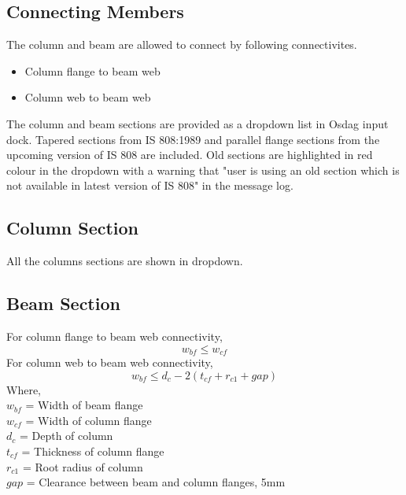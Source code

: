 \documentclass[11.5pt,a4paper,oneside]{report}
\begin{document}
\begin{Form}
\chapter{Connecting Members}
%
The column and beam are allowed to connect by following connectivites.
\begin{itemize}
	\item Column flange to beam web
	\item Column web to beam web
\end{itemize}
%
The column and beam sections are provided as a dropdown list in Osdag input dock. Tapered sections from IS 808:1989 and parallel flange sections from the upcoming version of IS 808 are included. Old sections are highlighted in red colour in the dropdown with a warning that "user is using an old section which is not available in latest version of IS 808" in the message log.
%
\section{Column Section}
%
All the columns sections are shown in dropdown.
\section{Beam Section}
%
For column flange to beam web connectivity, 
\begin{equation}
	w_{bf} \le w_{cf}
\end{equation}
%
For column web to beam web connectivity,
\begin{equation}
	w_{bf} \le d_c - 2 (t_{cf} + r_{c1} + gap)
\end{equation}
Where, \\
\indent $w_{bf}$ = Width of beam flange \\
\indent $w_{cf}$ =  Width of column flange \\
\indent $d_c$ = Depth of column \\
\indent $t_{cf}$ = Thickness of column flange \\
\indent $r_{c1}$ = Root radius of column \\
\indent $gap$ = Clearance between beam and column flanges, 5mm


\end{Form}
\end{document}
